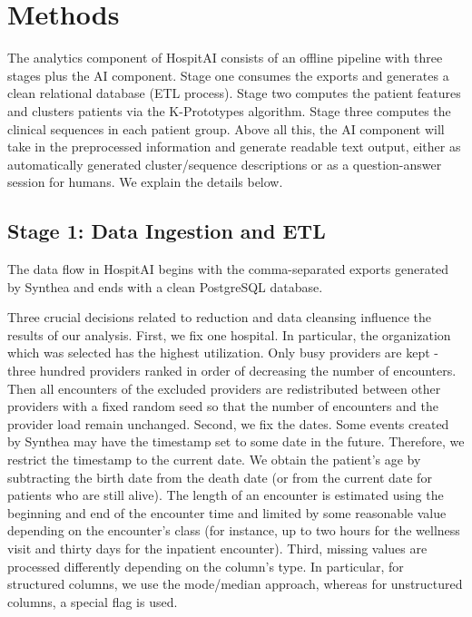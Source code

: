 \section{Methods}
\label{sec:methods}

The analytics component of HospitAI consists of an offline pipeline with three stages plus the AI component. Stage one consumes the exports and generates a clean relational database (ETL process). Stage two computes the patient features and clusters patients via the K-Prototypes algorithm. Stage three computes the clinical sequences in each patient group. Above all this, the AI component will take in the preprocessed information and generate readable text output, either as automatically generated cluster/sequence descriptions or as a question-answer session for humans. We explain the details below.

\subsection{Stage 1: Data Ingestion and ETL}

The data flow in HospitAI begins with the comma-separated exports generated by Synthea and ends with a clean PostgreSQL database.

Three crucial decisions related to reduction and data cleansing influence the results of our analysis. First, we fix one hospital. In particular, the organization which was selected has the highest utilization. Only busy providers are kept - three hundred providers ranked in order of decreasing the number of encounters. Then all encounters of the excluded providers are redistributed between other providers with a fixed random seed so that the number of encounters and the provider load remain unchanged. Second, we fix the dates. Some events created by Synthea may have the timestamp set to some date in the future. Therefore, we restrict the timestamp to the current date. We obtain the patient's age by subtracting the birth date from the death date (or from the current date for patients who are still alive). The length of an encounter is estimated using the beginning and end of the encounter time and limited by some reasonable value depending on the encounter's class (for instance, up to two hours for the wellness visit and thirty days for the inpatient encounter). Third, missing values are processed differently depending on the column's type. In particular, for structured columns, we use the mode/median approach, whereas for unstructured columns, a special flag is used.

